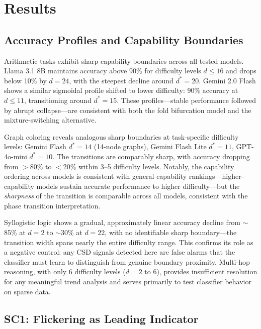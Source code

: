 \documentclass[11pt,letterpaper]{article}
\begin{document}
\section{Results}
\label{sec:results}

\subsection{Accuracy Profiles and Capability Boundaries}

Arithmetic tasks exhibit sharp capability boundaries across all tested models. Llama 3.1 8B maintains accuracy above 90\% for difficulty levels $d \leq 16$ and drops below 10\% by $d = 24$, with the steepest decline around $d^* = 20$. Gemini 2.0 Flash shows a similar sigmoidal profile shifted to lower difficulty: 90\% accuracy at $d \leq 11$, transitioning around $d^* = 15$. These profiles---stable performance followed by abrupt collapse---are consistent with both the fold bifurcation model and the mixture-switching alternative.

Graph coloring reveals analogous sharp boundaries at task-specific difficulty levels: Gemini Flash $d^* = 14$ (14-node graphs), Gemini Flash Lite $d^* = 11$, GPT-4o-mini $d^* = 10$. The transitions are comparably sharp, with accuracy dropping from $>$80\% to $<$20\% within 3--5 difficulty levels. Notably, the capability ordering across models is consistent with general capability rankings---higher-capability models sustain accurate performance to higher difficulty---but the \emph{sharpness} of the transition is comparable across all models, consistent with the phase transition interpretation.

Syllogistic logic shows a gradual, approximately linear accuracy decline from $\sim$85\% at $d=2$ to $\sim$30\% at $d=22$, with no identifiable sharp boundary---the transition width spans nearly the entire difficulty range. This confirms its role as a negative control: any CSD signals detected here are false alarms that the classifier must learn to distinguish from genuine boundary proximity. Multi-hop reasoning, with only 6 difficulty levels ($d = 2$ to 6), provides insufficient resolution for any meaningful trend analysis and serves primarily to test classifier behavior on sparse data.

\subsection{SC1: Flickering as Leading Indicator}
\end{document}
